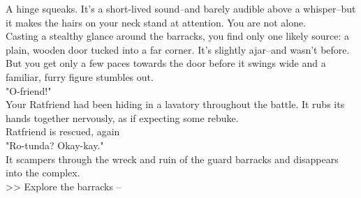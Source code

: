 A hinge squeaks. It's a short-lived sound--and barely audible above a whisper--but it makes the hairs on your neck stand at attention. You are not alone.\\

Casting a stealthy glance around the barracks, you find only one likely source: a plain, wooden door tucked into a far corner. It's slightly ajar--and wasn't before.\\

But you get only a few paces towards the door before it swings wide and a familiar, furry figure stumbles out.\\

"O-friend!"\\

Your Ratfriend had been hiding in a lavatory throughout the battle. It rubs its hands together nervously, as if expecting some rebuke.\\
 Ratfriend is rescued, again\\

"Ro-tunda? Okay-kay."\\

It scampers through the wreck and ruin of the guard barracks and disappears into the complex.\\

>> Explore the barracks -- 